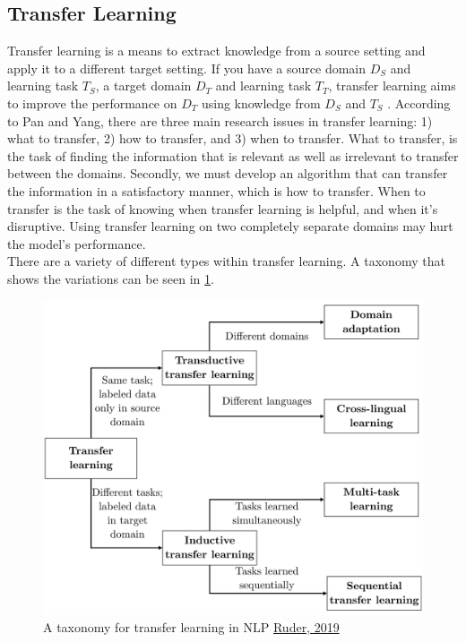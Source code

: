 \documentclass{report}
\begin{document}
\subsection{Transfer Learning}
Transfer learning is a means to extract knowledge from a source setting and apply it to a different target setting. If you have a source domain $D_S$ and learning task $T_S$, a target domain $D_T$ and learning task $T_T$, transfer learning aims to improve the performance on $D_T$ using knowledge from $D_S$ and $T_S$ \cite{5288526}. According to Pan and Yang, there are three main research issues in transfer learning: 1) what to transfer, 2) how to transfer, and 3) when to transfer. What to transfer, is the task of finding the information that is relevant as well as irrelevant to transfer between the domains. Secondly, we must develop an algorithm that can transfer the information in a satisfactory manner, which is how to transfer. When to transfer is the task of knowing when transfer learning is helpful, and when it's disruptive. Using transfer learning on two completely separate domains may hurt the model's performance\cite{5288526}.\\
There are a variety of different types within transfer learning. A taxonomy that shows the variations can be seen in \ref{fig:tltax}.
\begin{figure}[h!]
	\centering
	\includegraphics[scale=0.13]{img/tl_taxonomy}
	\caption{A taxonomy for transfer learning in NLP \href{ruder.io/thesis/neural_transfer_learning_for_nlp.pdf}{Ruder, 2019}}
	\label{fig:tltax}
\end{figure}%
\end{document}
